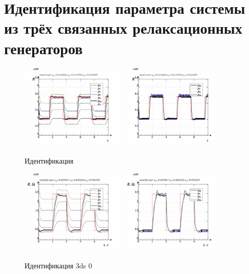 \section{Идентификация параметра системы из трёх связанных релаксационных генераторов}

\begin{figure}[htb!]
  \centerline{
    \includegraphics[width=0.45\textwidth]{p/relax3_read_id2-p_p_03.png}
    \hfill
    \includegraphics[width=0.45\textwidth]{p/relax3_read_id2-p_pp_03.png}
  }
  \caption{Идентификация }
  \label{atu:f:relax3d_id}
\end{figure}

\begin{figure}[htb!]
  \centerline{
    \includegraphics[width=0.45\textwidth]{p/relax3d_read_id2_0-p_p.png}
    \hfill
    \includegraphics[width=0.45\textwidth]{p/relax3d_read_id2_0-p_pp.png}
  }
  \caption{Идентификация 3ds 0}
  \label{atu:f:relax3ds_id_0}
\end{figure}

